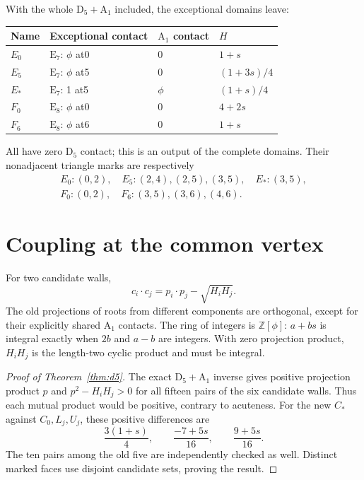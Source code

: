 \documentclass[11pt]{article}
\newcommand{\E}{\mathrm E}
\newcommand{\D}{\mathrm D}
\newcommand{\A}{\mathrm A}
\begin{document}
With the whole $\D_5+\A_1$ included, the exceptional domains leave:
\begin{center}\small
\begin{tabular}{llll}
\toprule
Name & Exceptional contact & $\A_1$ contact & $H$\\
\midrule
$E_0$&$\E_7$: $\phi$ at0&0&$1+s$\\
$E_5$&$\E_7$: $\phi$ at5&0&$(1+3s)/4$\\
$E_*$&$\E_7$: 1 at5&$\phi$&$(1+s)/4$\\
$F_0$&$\E_8$: $\phi$ at0&0&$4+2s$\\
$F_6$&$\E_8$: $\phi$ at6&0&$1+s$\\
\bottomrule
\end{tabular}
\end{center}
All have zero $\D_5$ contact; this is an output of the complete domains.
Their nonadjacent triangle marks are respectively
\[
\begin{gathered}
E_0:(0,2),\quad E_5:(2,4),(2,5),(3,5),\quad E_*:(3,5),\\
F_0:(0,2),\quad F_6:(3,5),(3,6),(4,6).
\end{gathered}
\]

\section{Coupling at the common vertex}
For two candidate walls,
\[
 c_i\cdot c_j=p_i\cdot p_j-\sqrt{H_iH_j}.
\]
The old projections of roots from different components are orthogonal,
except for their explicitly shared $\A_1$ contacts. The ring of integers
is $\mathbb Z[\phi]$: $a+bs$ is integral exactly when $2b$ and $a-b$
are integers. With zero projection product, $H_iH_j$ is the length-two
cyclic product and must be integral.

\begin{proof}[Proof of Theorem~\ref{thm:d5}]
The exact $\D_5+\A_1$ inverse gives positive projection product $p$
and $p^2-H_iH_j>0$ for all fifteen pairs of the six candidate walls.
Thus each mutual product would be positive, contrary to acuteness.
For the new $C_*$ against $C_0,L_j,U_j$, these positive differences are
\[
 \frac{3(1+s)}4,\qquad\frac{-7+5s}{16},\qquad\frac{9+5s}{16}.
\]
The ten pairs among the old five are independently checked as well.
Distinct marked faces use disjoint candidate sets, proving the result.
\end{proof}
\end{document}
